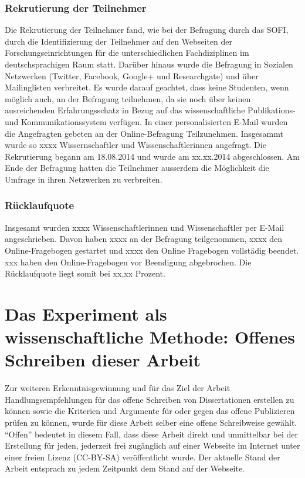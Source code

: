 \subsubsection{Rekrutierung der Teilnehmer}
Die Rekrutierung der Teilnehmer fand, wie bei der Befragung durch das SOFI, durch die Identifizierung der Teilnehmer auf den Webseiten der Forschungseinrichtungen für die unterschiedlichen Fachdiziplinen im deutschsprachigen Raum statt. Darüber hinaus wurde die Befragung in Sozialen Netzwerken (Twitter, Facebook, Google+ und Researchgate) und über Mailinglisten verbreitet. Es wurde darauf geachtet, dass keine Studenten, wenn möglich auch, an der Befragung teilnehmen, da sie noch über keinen ausreichenden Erfahrungsschatz in Bezug auf das wissenschaftliche Publikations- und Kommunikationssystem verfügen. In einer personalisierten E-Mail wurden die Angefragten gebeten an der Online-Befragung Teilzunehmen. Insgesammt wurde so xxxx Wissernschaftler und Wissenschaftlerinnen angefragt. Die Rekrutierung begann am 18.08.2014 und wurde am xx.xx.2014 abgeschlossen. Am Ende der Befragung hatten die Teilnehmer ausserdem die Möglichkeit die Umfrage in ihren Netzwerken zu verbreiten.

\subsubsection{Rücklaufquote}
Insgesamt wurden xxxx Wissenschaftlerinnen und Wissenschaftler per E-Mail angeschrieben. Davon haben xxxx an der Befragung teilgenommen, xxxx den Online-Fragebogen gestartet und xxxx den Online Fragebogen vollstädig beendet. xxx haben den Online-Fragebogen vor Beendigung abgebrochen. Die Rücklaufquote liegt somit bei xx,xx Prozent. 

\section{Das Experiment als wissenschaftliche Methode: Offenes Schreiben dieser Arbeit}
Zur weiteren Erkenntnisgewinnung und für das Ziel der Arbeit Handlungsempfehlungen für das offene Schreiben von Dissertationen erstellen zu können sowie die Kriterien und Argumente für oder gegen das offene Publizieren prüfen zu können, wurde für diese Arbeit selber eine offene Schreibweise gewählt. “Offen” bedeutet in diesem Fall, dass diese Arbeit direkt und unmittelbar bei der Erstellung für jeden, jederzeit frei zugänglich auf einer Webseite im Internet unter einer freien Lizenz (CC-BY-SA) veröffentlicht wurde. Der aktuelle Stand der Arbeit entsprach zu jedem Zeitpunkt dem Stand auf der Webseite. 

